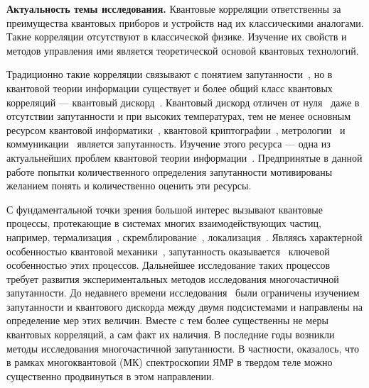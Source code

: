
\textbf{Актуальность темы исследования.}
Квантовые корреляции ответственны за преимущества квантовых приборов и устройств над их классическими аналогами.
Такие корреляции отсутствуют в классической физике.
Изучение их свойств и методов управления ими является теоретической основой квантовых технологий.

Традиционно такие корреляции связывают с понятием запутанности~\cite{Einstein1935},
но в квантовой теории информации существует и более общий класс квантовых корреляций --- квантовый дискорд~\cite{Bera2017}.
Квантовый дискорд отличен от нуля~\cite{Yurishchev2011} даже в отсутствии запутанности и при высоких температурах,
тем не менее основным ресурсом
квантовой информатики~\cite{Arute2019},
квантовой криптографии~\cite{Gisin2002},
метрологии~\cite{Toth2012}
и коммуникации~\cite{Yin2017}
является запутанность.
Изучение этого ресурса --- одна из актуальнейших проблем квантовой теории информации~\cite{Nielsen2010}.
Предпринятые в данной работе попытки количественного определения запутанности мотивированы
желанием понять и количественно оценить эти ресурсы.


С фундаментальной точки зрения большой интерес вызывают квантовые процессы,
протекающие в системах многих взаимодействующих частиц,
например, термализация~\cite{DAlessio2016}, скремблирование~\cite{Hosur2016},  локализация~\cite{Alvarez2010}.
Являясь характерной особенностью квантовой механики~\cite{Schrodinger1935},
запутанность оказывается~\cite{Kaufman2016, Neill2016, Garttner2018} ключевой особенностью этих процессов.
Дальнейшее исследование таких процессов
требует развития экспериментальных методов исследования многочастичной запутанности.
До недавнего времени исследования~\cite{Horodecki2009} были ограничены изучением запутанности
и квантового дискорда между двумя подсистемами
и направлены на определение мер этих величин.
Вместе с тем более существенны не меры квантовых корреляций,
а сам факт их наличия.
В последние годы возникли~\cite{Garttner2018} методы исследования многочастичной запутанности. 
В частности, оказалось, что в рамках многоквантовой (МК) спектроскопии ЯМР в твердом теле можно существенно продвинуться в этом направлении.

